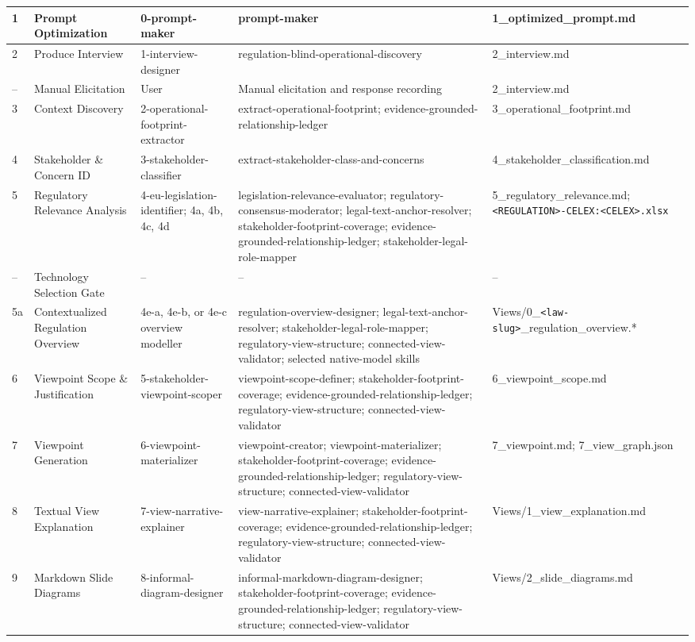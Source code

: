 \begin{landscape}
\begin{longtable}{@{}p{0.5cm}p{2.5cm}p{4.3cm}p{8.0cm}p{4.0cm}@{}}
1 & Prompt Optimization & 0-prompt-maker & prompt-maker & 1\_optimized\_prompt.md \\
\hline
2 & Produce Interview & 1-interview-designer & regulation-blind-operational-discovery & 2\_interview.md \\
\hline
-- & Manual Elicitation & User & Manual elicitation and response recording & 2\_interview.md \\
\hline
3 & Context Discovery & 2-operational-footprint-extractor & extract-operational-footprint; evidence-grounded-relationship-ledger & 3\_operational\_footprint.md \\
\hline
4 & Stakeholder \& Concern ID & 3-stakeholder-classifier & extract-stakeholder-class-and-concerns & 4\_stakeholder\_classification.md \\
\hline
5 & Regulatory Relevance Analysis & 4-eu-legislation-identifier; 4a, 4b, 4c, 4d & legislation-relevance-evaluator; regulatory-consensus-moderator; legal-text-anchor-resolver; stakeholder-footprint-coverage; evidence-grounded-relationship-ledger; stakeholder-legal-role-mapper & 5\_regulatory\_relevance.md; \texttt{<REGULATION>-CELEX:<CELEX>.xlsx} \\
\hline
-- & Technology Selection Gate & -- & -- & -- \\
\hline
5a & Contextualized Regulation Overview & 4e-a, 4e-b, or 4e-c overview modeller & regulation-overview-designer; legal-text-anchor-resolver; stakeholder-legal-role-mapper; regulatory-view-structure; connected-view-validator; selected native-model skills & Views/0\_\texttt{<law-slug>}\_regulation\_overview.* \\
\hline
6 & Viewpoint Scope \& Justification & 5-stakeholder-viewpoint-scoper & viewpoint-scope-definer; stakeholder-footprint-coverage; evidence-grounded-relationship-ledger; regulatory-view-structure; connected-view-validator & 6\_viewpoint\_scope.md \\
\hline
7 & Viewpoint Generation & 6-viewpoint-materializer & viewpoint-creator; viewpoint-materializer; stakeholder-footprint-coverage; evidence-grounded-relationship-ledger; regulatory-view-structure; connected-view-validator & 7\_viewpoint.md; 7\_view\_graph.json \\
\hline
8 & Textual View Explanation & 7-view-narrative-explainer & view-narrative-explainer; stakeholder-footprint-coverage; evidence-grounded-relationship-ledger; regulatory-view-structure; connected-view-validator & Views/1\_view\_explanation.md \\
\hline
9 & Markdown Slide Diagrams & 8-informal-diagram-designer & informal-markdown-diagram-designer; stakeholder-footprint-coverage; evidence-grounded-relationship-ledger; regulatory-view-structure; connected-view-validator & Views/2\_slide\_diagrams.md \\

\end{longtable}
\end{landscape}

